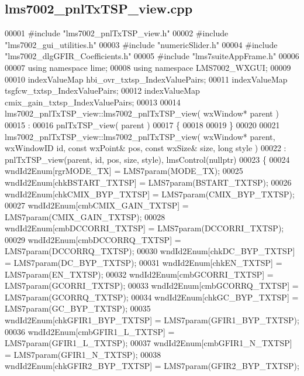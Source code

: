 \subsection{lms7002\+\_\+pnl\+Tx\+T\+S\+P\+\_\+view.\+cpp}
\label{lms7002__pnlTxTSP__view_8cpp_source}

\begin{DoxyCode}
00001 \textcolor{preprocessor}{#include "lms7002_pnlTxTSP_view.h"}
00002 \textcolor{preprocessor}{#include "lms7002_gui_utilities.h"}
00003 \textcolor{preprocessor}{#include "numericSlider.h"}
00004 \textcolor{preprocessor}{#include "lms7002_dlgGFIR_Coefficients.h"}
00005 \textcolor{preprocessor}{#include "lms7suiteAppFrame.h"}
00006 
00007 \textcolor{keyword}{using namespace }lime;
00008 \textcolor{keyword}{using namespace }LMS7002_WXGUI;
00009 
00010 indexValueMap hbi_ovr_txtsp_IndexValuePairs;
00011 indexValueMap tsgfcw_txtsp_IndexValuePairs;
00012 indexValueMap cmix_gain_txtsp_IndexValuePairs;
00013 
00014 lms7002_pnlTxTSP_view::lms7002_pnlTxTSP_view( wxWindow* parent )
00015 :
00016 pnlTxTSP_view( parent )
00017 \{
00018 
00019 \}
00020 
00021 lms7002_pnlTxTSP_view::lms7002_pnlTxTSP_view( wxWindow* parent, wxWindowID \textcolor{keywordtype}{id}, \textcolor{keyword}{const} wxPoint& pos, \textcolor{keyword}{const} 
      wxSize& size, \textcolor{keywordtype}{long} style )
00022     : pnlTxTSP_view(parent, id, pos, size, style), lmsControl(nullptr)
00023 \{
00024     wndId2Enum[rgrMODE_TX] = LMS7param(MODE_TX);
00025     wndId2Enum[chkBSTART_TXTSP] = LMS7param(BSTART_TXTSP);
00026     wndId2Enum[chkCMIX_BYP_TXTSP] = LMS7param(CMIX_BYP_TXTSP);
00027     wndId2Enum[cmbCMIX_GAIN_TXTSP] = LMS7param(CMIX_GAIN_TXTSP);
00028     wndId2Enum[cmbDCCORRI_TXTSP] = LMS7param(DCCORRI_TXTSP);
00029     wndId2Enum[cmbDCCORRQ_TXTSP] = LMS7param(DCCORRQ_TXTSP);
00030     wndId2Enum[chkDC_BYP_TXTSP] = LMS7param(DC_BYP_TXTSP);
00031     wndId2Enum[chkEN_TXTSP] = LMS7param(EN_TXTSP);
00032     wndId2Enum[cmbGCORRI_TXTSP] = LMS7param(GCORRI_TXTSP);
00033     wndId2Enum[cmbGCORRQ_TXTSP] = LMS7param(GCORRQ_TXTSP);
00034     wndId2Enum[chkGC_BYP_TXTSP] = LMS7param(GC_BYP_TXTSP);
00035     wndId2Enum[chkGFIR1_BYP_TXTSP] = LMS7param(GFIR1_BYP_TXTSP);
00036     wndId2Enum[cmbGFIR1_L_TXTSP] = LMS7param(GFIR1_L_TXTSP);
00037     wndId2Enum[cmbGFIR1_N_TXTSP] = LMS7param(GFIR1_N_TXTSP);
00038     wndId2Enum[chkGFIR2_BYP_TXTSP] = LMS7param(GFIR2_BYP_TXTSP);

\end{DoxyCode}
